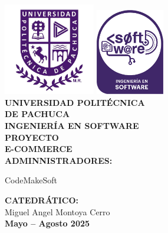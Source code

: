 \begin{titlepage}
	\centering
	\thispagestyle{empty}
	\noindent\includegraphics[width=4cm]{../logos/UPP_logo.png} 
	\noindent\hfill\includegraphics[width=3cm]{../logos/Soft_logo.png} \\[4em]
	{\LARGE\textbf{UNIVERSIDAD POLITÉCNICA}}\\[1em]
	{\LARGE\textbf{DE PACHUCA}}\\[2em]
	{\Large\textbf{INGENIERÍA EN SOFTWARE}}\\[3em]
	{\large\textbf{PROYECTO}}\\[2em]
	{\large\textbf{E-COMMERCE}}\\[3em]
	\large\textbf{ADMINNISTRADORES:}\\[1em]
	\begin{center}
		CodeMakeSoft 
	\end{center}
	\large\textbf{CATEDRÁTICO:}\\[1em]
	Miguel Angel Montoya Cerro\\ [3em]
	\textbf{Mayo -- Agosto 2025}
\end{titlepage}

